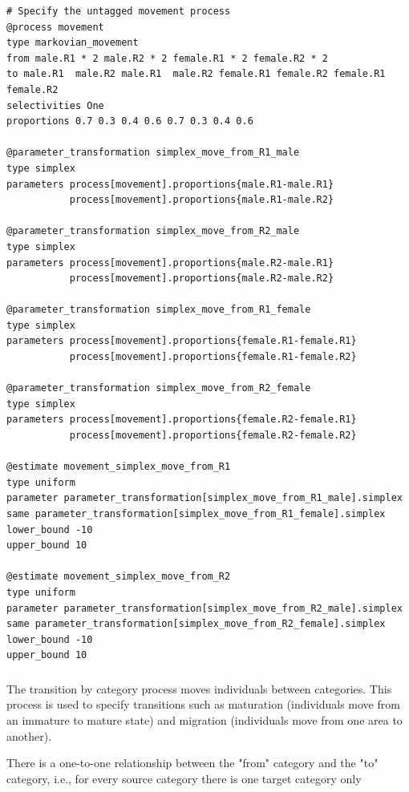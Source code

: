 {\small{\begin{verbatim}
# Specify the untagged movement process
@process movement
type markovian_movement
from male.R1 * 2 male.R2 * 2 female.R1 * 2 female.R2 * 2
to male.R1  male.R2 male.R1  male.R2 female.R1 female.R2 female.R1  female.R2
selectivities One
proportions 0.7 0.3 0.4 0.6 0.7 0.3 0.4 0.6

@parameter_transformation simplex_move_from_R1_male
type simplex
parameters process[movement].proportions{male.R1-male.R1}
           process[movement].proportions{male.R1-male.R2}

@parameter_transformation simplex_move_from_R2_male
type simplex
parameters process[movement].proportions{male.R2-male.R1}
           process[movement].proportions{male.R2-male.R2}
			
@parameter_transformation simplex_move_from_R1_female
type simplex
parameters process[movement].proportions{female.R1-female.R1} 
           process[movement].proportions{female.R1-female.R2}

@parameter_transformation simplex_move_from_R2_female
type simplex
parameters process[movement].proportions{female.R2-female.R1} 
           process[movement].proportions{female.R2-female.R2}

@estimate movement_simplex_move_from_R1
type uniform
parameter parameter_transformation[simplex_move_from_R1_male].simplex
same parameter_transformation[simplex_move_from_R1_female].simplex
lower_bound -10
upper_bound 10

@estimate movement_simplex_move_from_R2
type uniform
parameter parameter_transformation[simplex_move_from_R2_male].simplex
same parameter_transformation[simplex_move_from_R2_female].simplex
lower_bound -10
upper_bound 10
\end{verbatim}}}

\subsubsection{}\label{sec:Process-TransitionCategory}

The transition by category process moves individuals between categories. This process is used to specify transitions such as maturation (individuals move from an immature to mature state) and migration (individuals move from one area to another).

There is a one-to-one relationship between the "from" category and the "to" category, i.e., for every source category there is one target category only

